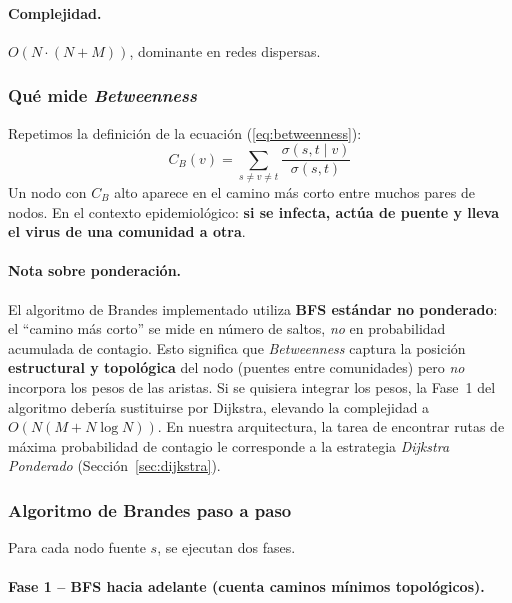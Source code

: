 \documentclass[spanish,notitlepage,letterpaper, 12pt]{article}
\begin{document}
\paragraph{Complejidad.} $O(N \cdot (N + M))$, dominante en redes dispersas.

\subsubsection{Qu\'e mide \textit{Betweenness}}

Repetimos la definici\'on de la ecuaci\'on (\ref{eq:betweenness}):
\[
C_B(v) = \sum_{s \neq v \neq t} \frac{\sigma(s,t \mid v)}{\sigma(s,t)}
\]
Un nodo con $C_B$ alto aparece en el camino m\'as corto entre muchos pares de nodos. En el contexto epidemiol\'ogico: \textbf{si se infecta, act\'ua de puente y lleva el virus de una comunidad a otra}.

\paragraph{Nota sobre ponderaci\'on.}
El algoritmo de Brandes implementado utiliza \textbf{BFS est\'andar no ponderado}: el ``camino m\'as corto'' se mide en n\'umero de saltos, \emph{no} en probabilidad acumulada de contagio. Esto significa que \textit{Betweenness} captura la posici\'on \textbf{estructural y topol\'ogica} del nodo (puentes entre comunidades) pero \emph{no} incorpora los pesos de las aristas. Si se quisiera integrar los pesos, la Fase~1 del algoritmo deber\'ia sustituirse por Dijkstra, elevando la complejidad a $O(N(M + N \log N))$. En nuestra arquitectura, la tarea de encontrar rutas de m\'axima probabilidad de contagio le corresponde a la estrategia \textit{Dijkstra Ponderado} (Secci\'on~\ref{sec:dijkstra}).

\subsubsection{Algoritmo de Brandes paso a paso}

Para cada nodo fuente $s$, se ejecutan dos fases.

\paragraph{Fase 1 -- BFS hacia adelante (cuenta caminos m\'inimos topol\'ogicos).}
\end{document}
